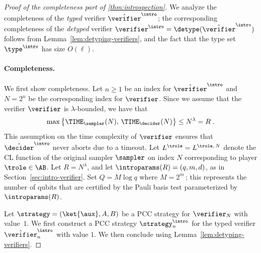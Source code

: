 \begin{proof}[Proof of the completeness part of \cref{thm:introspection}]
  We analyze the completeness of the \emph{typed}
  verifier $\tvint$; the corresponding completeness of the
  \emph{detyped} verifier $\vint = \detype(\tvint)$ follows from
  Lemma~\ref{lem:detyping-verifiers}, and the fact that the type set
  $\type^\intro$ has size $O(\ell)$.

  \paragraph{Completeness.}
  We first show completeness.
  Let $n\geq 1$ be an index for $\tvint$ and $N = 2^n$ be the corresponding
  index for $\verifier$.
  Since we assume that the verifier $\verifier$ is $\lambda$-bounded, we have
  that
  \begin{equation}
    \label{eq:intro-complexity-assump}
    \max \big\{ \TIME_\sampler(N), \, \TIME_\decider(N) \big\} \leq N^\lambda = R\;.
  \end{equation}
  This assumption on the time complexity of $\verifier$ ensures that
  $\tdint$ never aborts due to a timeout.
	Let $L^\trole = L^{\trole,\, N}$ denote the CL function of the original
  sampler $\sampler$ on index $N$ corresponding to player $\trole \in \AB$.
  Let $R = N^\lambda$, and let $\introparams(R) =
  (q,m,d)$, as in Section~\ref{sec:intro-verifier}.
  Set $Q = M\log q$ where $M=2^m$\,; this represents the number of qubits that are
  certified by the Pauli basis test parameterized by $\introparams(R)$.
  
  Let $\strategy = (\ket{\aux}, A, B)$ be a PCC strategy for $\verifier_N$ with
  value~$1$.
  We first construct a PCC strategy $\strategy^\intro_n$ for the typed verifier
  $\tvint_n$ with value $1$.
  We then conclude using Lemma~\ref{lem:detyping-verifiers}.


\end{proof}
